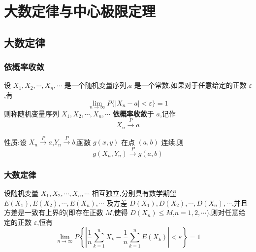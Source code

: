 
\chapter{大数定律与中心极限定理}

\section{大数定律}

\subsection{依概率收敛}

\begin{definition}
    设 $X_1, X_2, \cdots, X_n, \cdots$ 是一个随机变量序列,$a$ 是一个常数.如果对于任意给定的正数 $\varepsilon$,有
    $$
    \lim_{n \to \infty} P \{ |X_n-a| < \varepsilon \} = 1
    $$
    则称随机变量序列 $X_1, X_2, \cdots, X_n, \cdots$ \textbf{依概率收敛}于 $a$,记作
    $$
    X_n \overset{P}{\longrightarrow} a
    $$
\end{definition}

性质:设 $X_n \overset{P}{\longrightarrow} a$,$Y_n \overset{P}{\longrightarrow} b$,函数 $g(x,y)$ 在点 $(a,b)$ 连续,则
$$
g(X_n, Y_n) \overset{P}{\longrightarrow} g(a,b)
$$

\subsection{大数定律}

\begin{theorem}[][切比雪夫定理]
    设随机变量 $X_1, X_2, \cdots, X_n, \cdots$ 相互独立,分别具有数学期望 $E(X_1), E(X_2), \cdots, E(X_n), \cdots$ 及方差 $D(X_1), D(X_2), \cdots, D(X_n), \cdots$,并且方差是一致有上界的(即存在正数 $M$,使得 $D(X_n) \leqslant M$,$n=1,2,\cdots$),则对任意给定的正数 $\varepsilon$,恒有
    $$
    \lim_{n \to \infty} P \left\{ \left| \dfrac{1}{n} \sum_{k=1}^n X_k - \dfrac{1}{n} \sum_{k=1}^n E(X_k) \right| < \varepsilon \right\} = 1
    $$
\end{theorem}

